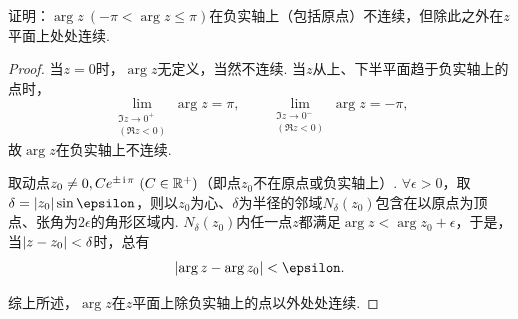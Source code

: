 \begin{example}
证明：\(\arg z\ (-\pi < \arg z \leq \pi)\)在负实轴上（包括原点）不连续，但除此之外在\(z\)平面上处处连续.
\begin{proof}
当\(z = 0\)时，\(\arg z\)无定义，当然不连续.
当\(z\)从上、下半平面趋于负实轴上的点时，\begin{equation*}
\lim_{\substack{\Im z \to 0^+ \\ (\Re z < 0)}} \arg z = \pi,
\qquad
\lim_{\substack{\Im z \to 0^- \\ (\Re z < 0)}} \arg z = -\pi,
\end{equation*}故\(\arg z\)在负实轴上不连续.

取动点\(z_0\neq0,Ce^{\pm\iu\pi}\ (C\in\mathbb{R}^+)\)（即点\(z_0\)不在原点或负实轴上）.
\(\forall \epsilon > 0\)，取\(\delta = \abs{z_0} \sin\epsilon\)，则以\(z_0\)为心、\(\delta\)为半径的邻域\(N_{\delta}(z_0)\)包含在以原点为顶点、张角为\(2\epsilon\)的角形区域内.
\(N_{\delta}(z_0)\)内任一点\(z\)都满足\(\arg z < \arg z_0 + \epsilon\)，于是，当\(\abs{z - z_0} < \delta\)时，总有\begin{equation*}
\abs{\arg z - \arg z_0} < \epsilon.
\end{equation*}

综上所述，\(\arg z\)在\(z\)平面上除负实轴上的点以外处处连续.
\end{proof}
\end{example}
